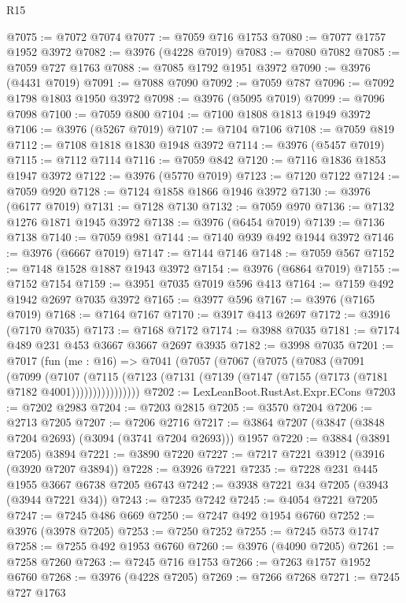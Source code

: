 \begin{lexlean}{R15}
\begin{coremodule}
@7075 := @7072 @7074
@7077 := @7059 @716 @1753
@7080 := @7077 @1757 @1952 @3972
@7082 := @3976 (@4228 @7019)
@7083 := @7080 @7082
@7085 := @7059 @727 @1763
@7088 := @7085 @1792 @1951 @3972
@7090 := @3976 (@4431 @7019)
@7091 := @7088 @7090
@7092 := @7059 @787
@7096 := @7092 @1798 @1803 @1950 @3972
@7098 := @3976 (@5095 @7019)
@7099 := @7096 @7098
@7100 := @7059 @800
@7104 := @7100 @1808 @1813 @1949 @3972
@7106 := @3976 (@5267 @7019)
@7107 := @7104 @7106
@7108 := @7059 @819
@7112 := @7108 @1818 @1830 @1948 @3972
@7114 := @3976 (@5457 @7019)
@7115 := @7112 @7114
@7116 := @7059 @842
@7120 := @7116 @1836 @1853 @1947 @3972
@7122 := @3976 (@5770 @7019)
@7123 := @7120 @7122
@7124 := @7059 @920
@7128 := @7124 @1858 @1866 @1946 @3972
@7130 := @3976 (@6177 @7019)
@7131 := @7128 @7130
@7132 := @7059 @970
@7136 := @7132 @1276 @1871 @1945 @3972
@7138 := @3976 (@6454 @7019)
@7139 := @7136 @7138
@7140 := @7059 @981
@7144 := @7140 @939 @492 @1944 @3972
@7146 := @3976 (@6667 @7019)
@7147 := @7144 @7146
@7148 := @7059 @567
@7152 := @7148 @1528 @1887 @1943 @3972
@7154 := @3976 (@6864 @7019)
@7155 := @7152 @7154
@7159 := @3951 @7035 @7019 @596 @413
@7164 := @7159 @492 @1942 @2697 @7035 @3972
@7165 := @3977 @596
@7167 := @3976 (@7165 @7019)
@7168 := @7164 @7167
@7170 := @3917 @413 @2697
@7172 := @3916 (@7170 @7035)
@7173 := @7168 @7172
@7174 := @3988 @7035
@7181 := @7174 @489 @231 @453 @3667 @3667 @2697 @3935
@7182 := @3998 @7035
@7201 := @7017
    (fun (me : @16) =>
    @7041
      (@7057
        (@7067
          (@7075
            (@7083
              (@7091
                (@7099
                  (@7107
                    (@7115
                      (@7123 (@7131 (@7139 (@7147 (@7155 (@7173 (@7181 @7182 @4001))))))))))))))))
@7202 := LexLeanBoot.RustAst.Expr.ECons
@7203 := @7202 @2983
@7204 := @7203 @2815
@7205 := @3570 @7204
@7206 := @2713 @7205
@7207 := @7206 @2716
@7217 := @3864 @7207 (@3847 (@3848 @7204 @2693) (@3094 (@3741 @7204 @2693))) @1957
@7220 := @3884 (@3891 @7205) @3894
@7221 := @3890 @7220
@7227 := @7217 @7221 @3912 (@3916 (@3920 @7207 @3894))
@7228 := @3926 @7221
@7235 := @7228 @231 @445 @1955 @3667 @6738 @7205 @6743
@7242 := @3938 @7221 @34 @7205 (@3943 (@3944 @7221 @34))
@7243 := @7235 @7242
@7245 := @4054 @7221 @7205
@7247 := @7245 @486 @669
@7250 := @7247 @492 @1954 @6760
@7252 := @3976 (@3978 @7205)
@7253 := @7250 @7252
@7255 := @7245 @573 @1747
@7258 := @7255 @492 @1953 @6760
@7260 := @3976 (@4090 @7205)
@7261 := @7258 @7260
@7263 := @7245 @716 @1753
@7266 := @7263 @1757 @1952 @6760
@7268 := @3976 (@4228 @7205)
@7269 := @7266 @7268
@7271 := @7245 @727 @1763

\end{coremodule}
\end{lexlean}
